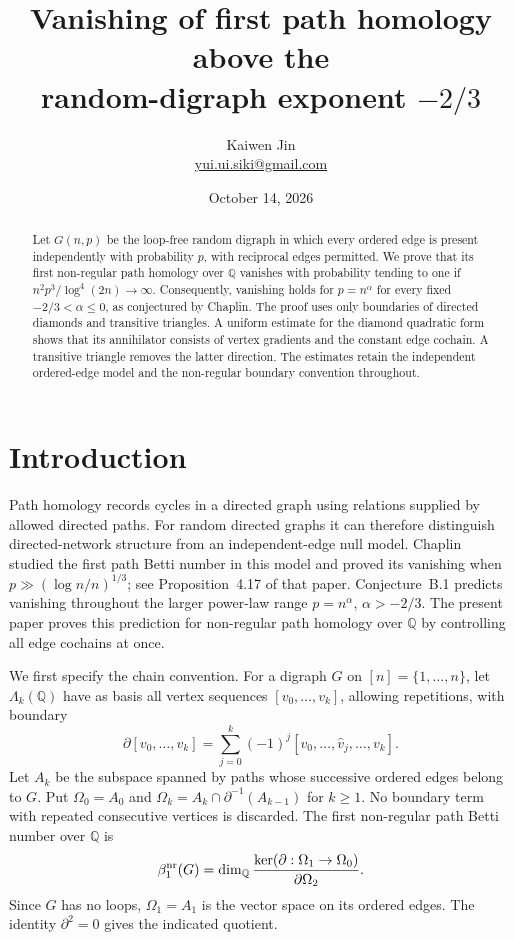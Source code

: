 \documentclass[11pt]{article}
\title{Vanishing of first path homology above the\texorpdfstring{\\}{ }random-digraph exponent $-2/3$}
\author{Kaiwen Jin\\\small\href{mailto:yui.ui.siki@gmail.com}{yui.ui.siki@gmail.com}}
\date{October 14, 2026}
\theoremstyle{remark}
\newcommand{\Q}{\mathbb Q}
\begin{document}
\maketitle
\begin{abstract}
Let $G(n,p)$ be the loop-free random digraph in which every ordered edge is
present independently with probability $p$, with reciprocal edges permitted.
We prove that its first non-regular path homology over $\Q$ vanishes with
probability tending to one if $n^2p^3/\log^4(2n)\to\infty$.
Consequently, vanishing holds for $p=n^\alpha$ for every fixed
$-2/3<\alpha\leq0$, as conjectured by Chaplin.
The proof uses only boundaries of directed diamonds and transitive triangles.
A uniform estimate for the diamond quadratic form shows that its annihilator
consists of vertex gradients and the constant edge cochain. A transitive
triangle removes the latter direction. The estimates retain the independent
ordered-edge model and the non-regular boundary convention throughout.
\end{abstract}

\section{Introduction}

Path homology records cycles in a directed graph using relations supplied by
allowed directed paths. For random directed graphs it can therefore distinguish
directed-network structure from an independent-edge null model.
Chaplin~\cite{Chaplin} studied the first path Betti number in this model and
proved its vanishing when $p\gg(\log n/n)^{1/3}$; see
Proposition~4.17 of that paper. Conjecture~B.1 predicts vanishing throughout the
larger power-law range $p=n^\alpha$, $\alpha>-2/3$.
The present paper proves this prediction for non-regular path homology over
$\Q$ by controlling all edge cochains at once.

We first specify the chain convention. For a digraph $G$ on $[n]=\{1,\ldots,n\}$,
let $\Lambda_k(\Q)$ have as basis all vertex sequences
$[v_0,\ldots,v_k]$, allowing repetitions, with boundary
\[
 \partial[v_0,\ldots,v_k]
 =\sum_{j=0}^k(-1)^j[v_0,\ldots,\widehat v_j,\ldots,v_k].
\]
Let $A_k$ be the subspace spanned by paths whose successive ordered edges
belong to $G$. Put $\Omega_0=A_0$ and
$\Omega_k=A_k\cap\partial^{-1}(A_{k-1})$ for $k\geq1$.
No boundary term with repeated consecutive vertices is discarded.
The first non-regular path Betti number over $\Q$ is
\[
 \beta_1^{\rm nr}(G)
 =\dim_\Q\frac{\ker(\partial:\Omega_1\to\Omega_0)}{\partial\Omega_2}.
\]
Since $G$ has no loops, $\Omega_1=A_1$ is the vector space on its ordered
edges. The identity $\partial^2=0$ gives the indicated quotient.
\end{document}
